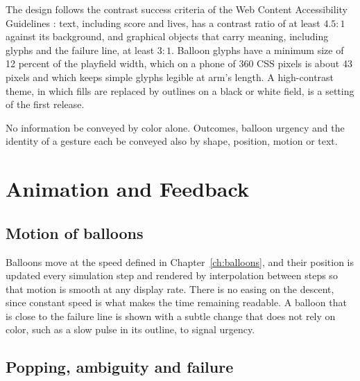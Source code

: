 The design follows the contrast success criteria of the Web Content Accessibility Guidelines \cite{wcag22}:\evD{} text, including score and lives, has a contrast ratio of at least $4.5{:}1$ against its background, and graphical objects that carry meaning, including glyphs and the failure line, at least $3{:}1$. Balloon glyphs have a minimum size of 12 percent of the playfield width, which on a phone of 360 CSS pixels is about 43 pixels and which keeps simple glyphs legible at arm's length. A high-contrast theme, in which fills are replaced by outlines on a black or white field, is a setting of the first release.

\begin{requirement}\label{req:redundant}
No information \must{} be conveyed by color alone. Outcomes, balloon urgency and the identity of a gesture \must{} each be conveyed also by shape, position, motion or text.\evS
\end{requirement}

\chapter{Animation and Feedback}\label{ch:animation}

\section{Motion of balloons}

Balloons move at the speed defined in Chapter~\ref{ch:balloons}, and their position is updated every simulation step and rendered by interpolation between steps so that motion is smooth at any display rate. There is no easing on the descent, since constant speed is what makes the time remaining readable. A balloon that is close to the failure line is shown with a subtle change that does not rely on color, such as a slow pulse in its outline, to signal urgency.

\section{Popping, ambiguity and failure}

